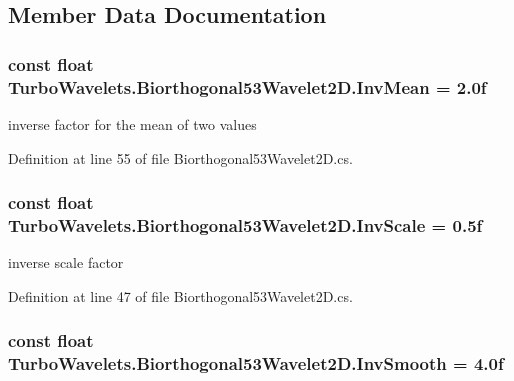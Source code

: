 \subsection{\-Member \-Data \-Documentation}
\hypertarget{class_turbo_wavelets_1_1_biorthogonal53_wavelet2_d_a60d0110965f0ac833e932ad39b3d6f46}{
\subsubsection[{\-Inv\-Mean}]{\setlength{\rightskip}{0pt plus 5cm}const float {\bf \-Turbo\-Wavelets.\-Biorthogonal53\-Wavelet2\-D.\-Inv\-Mean} = 2.\-0f}}\label{class_turbo_wavelets_1_1_biorthogonal53_wavelet2_d_a60d0110965f0ac833e932ad39b3d6f46}


inverse factor for the mean of two values 



\-Definition at line 55 of file \-Biorthogonal53\-Wavelet2\-D.\-cs.

\hypertarget{class_turbo_wavelets_1_1_biorthogonal53_wavelet2_d_a02e708dc75d423093b1a022cc93f0388}{
\subsubsection[{\-Inv\-Scale}]{\setlength{\rightskip}{0pt plus 5cm}const float {\bf \-Turbo\-Wavelets.\-Biorthogonal53\-Wavelet2\-D.\-Inv\-Scale} = 0.\-5f}}\label{class_turbo_wavelets_1_1_biorthogonal53_wavelet2_d_a02e708dc75d423093b1a022cc93f0388}


inverse scale factor 



\-Definition at line 47 of file \-Biorthogonal53\-Wavelet2\-D.\-cs.

\hypertarget{class_turbo_wavelets_1_1_biorthogonal53_wavelet2_d_aef40af813a0abea998b61fdb7ce34f5d}{
\subsubsection[{\-Inv\-Smooth}]{\setlength{\rightskip}{0pt plus 5cm}const float {\bf \-Turbo\-Wavelets.\-Biorthogonal53\-Wavelet2\-D.\-Inv\-Smooth} = 4.\-0f}}\label{class_turbo_wavelets_1_1_biorthogonal53_wavelet2_d_aef40af813a0abea998b61fdb7ce34f5d}


